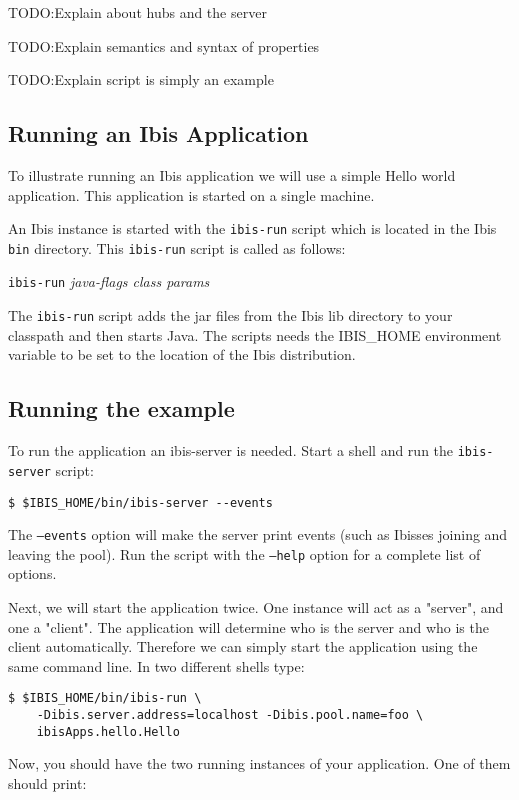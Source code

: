 \documentclass[10pt]{article}
\newcommand{\mysubsection}[1]{\subsection{#1}\label{#1}}
\begin{document}
TODO:Explain about hubs and the server

TODO:Explain semantics and syntax of properties 

TODO:Explain script is simply an example

\mysubsection{Running an Ibis Application}

To illustrate running an Ibis application we will use a simple Hello
world application. This application is started on a single machine.

An Ibis instance is started with the \texttt{ibis-run} script which
is located in the Ibis \texttt{bin} directory.  This \texttt{ibis-run}
script is called as follows:
\begin{center}
\texttt{ibis-run} \emph{java-flags class params}
\end{center}

The \texttt{ibis-run} script adds the jar files
from the Ibis lib directory to your classpath and then starts Java. The
scripts needs the IBIS\_HOME environment variable to be set to the
location of the Ibis distribution.

\mysubsection{Running the example}
To run the application an ibis-server is needed. Start a shell and
run the \texttt{ibis-server} script:
\noindent
{\small
\begin{verbatim}
$ $IBIS_HOME/bin/ibis-server --events
\end{verbatim}
}
\noindent

The \texttt{--events} option will make the server print events (such as
Ibisses joining and leaving the pool). Run the script with the
\texttt{--help} option for a complete list of options.

Next, we will start the application twice. One instance will act as a  
"server", and one a "client". The application will determine who is
the server and who is the client automatically. Therefore we can simply start the application using
the same command line. In two different shells type:

\noindent
{\small
\begin{verbatim}
$ $IBIS_HOME/bin/ibis-run \
    -Dibis.server.address=localhost -Dibis.pool.name=foo \
    ibisApps.hello.Hello
\end{verbatim}
}
\noindent
Now, you should have the two running instances of your application. One of them should print:

 \noindent 
\end{document}
